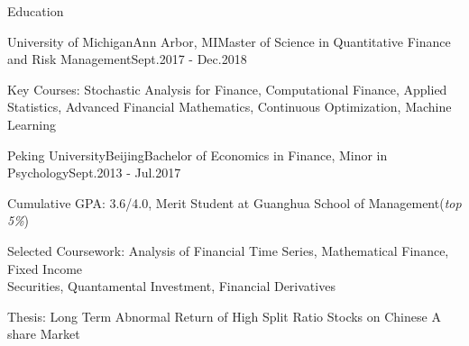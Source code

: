 \documentclass{resume02} %
\begin{document}

\begin{rSection}{Education}

\begin{rSubsection}{University of Michigan}{Ann Arbor, MI}{Master of Science in Quantitative Finance and Risk Management}{Sept.2017 - Dec.2018}
\item Key Courses: Stochastic Analysis for Finance, Computational Finance, Applied Statistics, Advanced Financial Mathematics, Continuous Optimization, Machine Learning
\end{rSubsection}

\begin{rSubsection}{Peking University}{Beijing}{Bachelor of Economics in Finance, Minor in Psychology}{Sept.2013 - Jul.2017}
\item Cumulative GPA: 3.6/4.0, Merit Student at Guanghua School of Management({\em top 5\%})
\item Selected Coursework: Analysis of Financial Time Series, Mathematical Finance, Fixed Income \\Securities, Quantamental Investment, Financial Derivatives
\item Thesis: Long Term Abnormal Return of High Split Ratio Stocks on Chinese A share Market
\end{rSubsection}

\end{rSection}

\end{document}
